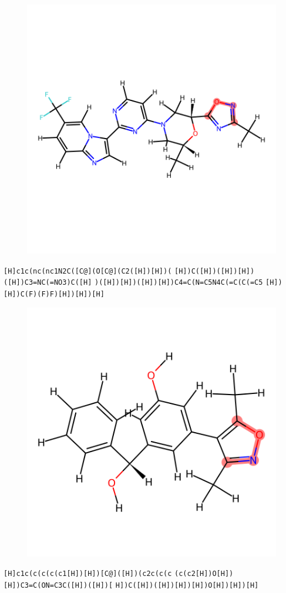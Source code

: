 \documentclass{article}
\begin{document}
\begin{figure}[ht]
\centering
    \includegraphics{mol70.png}
\end{figure}
\verb|[H]c1c(nc(nc1N2C([C@](O[C@](C2([H])[H])(| \verb|[H])C([H])([H])[H])([H])C3=NC(=NO3)C([H]| \verb|)([H])[H])([H])[H])C4=C(N=C5N4C(=C(C(=C5| \verb|[H])[H])C(F)(F)F)[H])[H])[H]|

\begin{figure}[ht]
\centering
    \includegraphics{mol71.png}
\end{figure}
\verb|[H]c1c(c(c(c(c1[H])[H])[C@]([H])(c2c(c(c| \verb|(c(c2[H])O[H])[H])C3=C(ON=C3C([H])([H])[| \verb|H])C([H])([H])[H])[H])O[H])[H])[H]|
\end{document}
